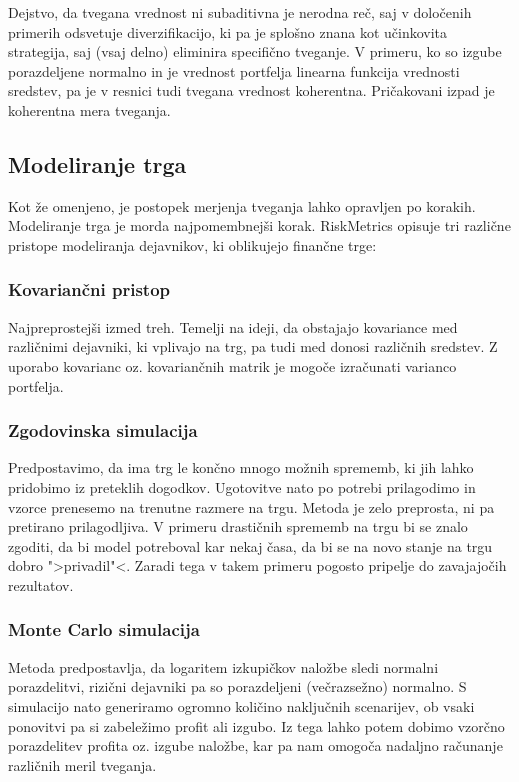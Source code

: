 \documentclass[12pt,a4paper]{amsart}
\theoremstyle{definition} %
\theoremstyle{plain} %
\begin{document}
Dejstvo, da tvegana vrednost ni subaditivna je nerodna reč, saj v določenih 
primerih odsvetuje diverzifikacijo, ki pa je splošno znana kot učinkovita strategija, 
saj (vsaj delno) eliminira specifično tveganje. V primeru, ko so izgube porazdeljene 
normalno in je vrednost portfelja linearna funkcija vrednosti sredstev, pa je v 
resnici tudi tvegana vrednost koherentna. Pričakovani izpad je koherentna 
mera tveganja.


\subsection{Modeliranje trga}
Kot že omenjeno, je postopek merjenja tveganja lahko opravljen po korakih. Modeliranje trga je morda
najpomembnejši korak. RiskMetrics opisuje
tri različne pristope modeliranja dejavnikov, ki oblikujejo finančne trge:

\subsubsection{Kovariančni pristop}
Najpreprostejši izmed treh. Temelji na ideji, da
obstajajo kovariance med različnimi dejavniki, ki vplivajo na trg, pa tudi 
med donosi različnih sredstev. Z uporabo kovarianc oz. kovariančnih 
matrik je mogoče izračunati varianco portfelja. 


\subsubsection{Zgodovinska simulacija}
Predpostavimo, da ima trg le končno mnogo
možnih sprememb, ki jih lahko pridobimo iz preteklih dogodkov. Ugotovitve 
nato po potrebi prilagodimo in vzorce prenesemo na trenutne razmere na 
trgu. Metoda je zelo preprosta, ni pa pretirano prilagodljiva. V primeru 
drastičnih sprememb na trgu bi se znalo zgoditi, da bi model potreboval kar
nekaj časa, da bi se na novo stanje na trgu dobro ">privadil"<. Zaradi tega 
v takem primeru pogosto pripelje do zavajajočih rezultatov.


\subsubsection{Monte Carlo simulacija}
Metoda predpostavlja, da logaritem izkupičkov
naložbe sledi normalni porazdelitvi, rizični dejavniki pa so porazdeljeni 
(večrazsežno) normalno. S simulacijo nato generiramo ogromno količino 
naključnih scenarijev, ob vsaki ponovitvi pa si zabeležimo
profit ali izgubo. Iz tega lahko potem dobimo vzorčno porazdelitev
profita oz. izgube naložbe, kar pa nam omogoča nadaljno računanje 
različnih meril tveganja. 
\end{document}
